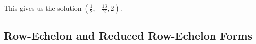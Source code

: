\documentclass{ximera}
\begin{document}
\begin{exploration}
This gives us the solution $(\frac{1}{2}, -\frac{13}{2}, 2)$.

\end{exploration}



\subsection*{Row-Echelon and Reduced Row-Echelon Forms}
\end{document}
